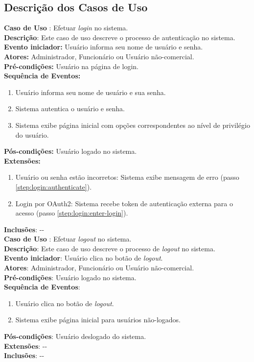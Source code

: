 \documentclass[]{politex}
\begin{document}
\subsection{Descrição dos Casos de Uso}

\noindent \textbf{Caso de Uso }: Efetuar \textit{login} no
sistema. \\
\textbf{Descrição}: Este caso de uso descreve o processo de autenticação no
sistema. \\
\textbf{Evento iniciador:} Usuário informa seu nome de usuário e senha. \\
\textbf{Atores:} Administrador, Funcionário ou Usuário não-comercial. \\
\textbf{Pré-condições:} Usuário na página de login. \\
\textbf{Sequência de Eventos:}
\begin{enumerate}
\item\label{step:login:enter-login} Usuário informa seu nome de usuário e sua
senha.
\item\label{step:login:authenticate} Sistema autentica o usuário e senha.
\item Sistema exibe página inicial com opções correspondentes ao nível de
privilégio do usuário.
\end{enumerate}
\textbf{Pós-condições:} Usuário logado no sistema. \\
\textbf{Extensões:}
\begin{enumerate}
\item Usuário ou senha estão incorretos: Sistema exibe mensagem de erro (passo
\ref{step:login:authenticate}).
\item Login por OAuth2: Sistema recebe token de autenticação externa para o
acesso (passo \ref{step:login:enter-login}).
\end{enumerate}
\textbf{Inclusões}: -{}- \\

\noindent \textbf{Caso de Uso }: Efetuar \textit{logout} no
sistema. \\
\textbf{Descrição}: Este caso de uso descreve o processo de \textit{logout} no
sistema. \\
\textbf{Evento iniciador}: Usuário clica no botão de \textit{logout}. \\
\textbf{Atores}: Administrador, Funcionário ou Usuário não-comercial. \\
\textbf{Pré-condições}: Usuário logado no sistema. \\
\textbf{Sequência de Eventos}:
\begin{enumerate}
\item Usuário clica no botão de \textit{logout}.
\item Sistema exibe página inicial para usuários não-logados.
\end{enumerate}
\textbf{Pós-condições}: Usuário deslogado do sistema. \\
\textbf{Extensões}: -{}- \\
\textbf{Inclusões}: -{}- \\
\end{document}
